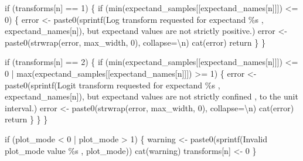 \documentclass[
  letterpaper,
  DIV=11,
  numbers=noendperiod]{scrartcl}
\newenvironment{Shaded}{\begin{snugshade}}{\end{snugshade}}
\newcommand{\AttributeTok}[1]{\textcolor[rgb]{0.40,0.45,0.13}{#1}}
\newcommand{\ControlFlowTok}[1]{\textcolor[rgb]{0.00,0.23,0.31}{#1}}
\newcommand{\DecValTok}[1]{\textcolor[rgb]{0.68,0.00,0.00}{#1}}
\newcommand{\FunctionTok}[1]{\textcolor[rgb]{0.28,0.35,0.67}{#1}}
\newcommand{\NormalTok}[1]{\textcolor[rgb]{0.00,0.23,0.31}{#1}}
\newcommand{\OtherTok}[1]{\textcolor[rgb]{0.00,0.23,0.31}{#1}}
\newcommand{\SpecialCharTok}[1]{\textcolor[rgb]{0.37,0.37,0.37}{#1}}
\newcommand{\StringTok}[1]{\textcolor[rgb]{0.13,0.47,0.30}{#1}}
\begin{document}
\begin{Shaded}
\begin{Highlighting}[]
    \ControlFlowTok{if}\NormalTok{ (transforms[n] }\SpecialCharTok{==} \DecValTok{1}\NormalTok{) \{}
      \ControlFlowTok{if}\NormalTok{ (}\FunctionTok{min}\NormalTok{(expectand\_samples[[expectand\_names[n]]]) }\SpecialCharTok{\textless{}=} \DecValTok{0}\NormalTok{) \{}
\NormalTok{        error }\OtherTok{\textless{}{-}} 
          \FunctionTok{paste0}\NormalTok{(}\FunctionTok{sprintf}\NormalTok{(}\StringTok{\textquotesingle{}Log transform requested for expectand \%s \textquotesingle{}}\NormalTok{, }
\NormalTok{                          expectand\_names[n]),}
                 \StringTok{\textquotesingle{}but expectand values are not strictly positive.\textquotesingle{}}\NormalTok{)}
\NormalTok{        error }\OtherTok{\textless{}{-}} \FunctionTok{paste0}\NormalTok{(}\FunctionTok{strwrap}\NormalTok{(error, max\_width, }\DecValTok{0}\NormalTok{), }\AttributeTok{collapse=}\StringTok{\textquotesingle{}}\SpecialCharTok{\textbackslash{}n}\StringTok{\textquotesingle{}}\NormalTok{)}
        \FunctionTok{cat}\NormalTok{(error)}
\NormalTok{        return}
\NormalTok{      \}}
\NormalTok{    \}}
    
    \ControlFlowTok{if}\NormalTok{ (transforms[n] }\SpecialCharTok{==} \DecValTok{2}\NormalTok{) \{}
      \ControlFlowTok{if}\NormalTok{ (}\FunctionTok{min}\NormalTok{(expectand\_samples[[expectand\_names[n]]]) }\SpecialCharTok{\textless{}=} \DecValTok{0} \SpecialCharTok{|}
          \FunctionTok{max}\NormalTok{(expectand\_samples[[expectand\_names[n]]]) }\SpecialCharTok{\textgreater{}=} \DecValTok{1}\NormalTok{) \{}
\NormalTok{        error }\OtherTok{\textless{}{-}} 
          \FunctionTok{paste0}\NormalTok{(}\FunctionTok{sprintf}\NormalTok{(}\StringTok{\textquotesingle{}Logit transform requested for expectand \%s \textquotesingle{}}\NormalTok{, }
\NormalTok{                          expectand\_names[n]),}
                 \StringTok{\textquotesingle{}but expectand values are not strictly confined \textquotesingle{}}\NormalTok{,}
                 \StringTok{\textquotesingle{}to the unit interval.\textquotesingle{}}\NormalTok{)}
\NormalTok{        error }\OtherTok{\textless{}{-}} \FunctionTok{paste0}\NormalTok{(}\FunctionTok{strwrap}\NormalTok{(error, max\_width, }\DecValTok{0}\NormalTok{), }\AttributeTok{collapse=}\StringTok{\textquotesingle{}}\SpecialCharTok{\textbackslash{}n}\StringTok{\textquotesingle{}}\NormalTok{)}
        \FunctionTok{cat}\NormalTok{(error)}
\NormalTok{        return}
\NormalTok{      \}}
\NormalTok{    \}}
\NormalTok{  \}}
  
  \ControlFlowTok{if}\NormalTok{ (plot\_mode }\SpecialCharTok{\textless{}} \DecValTok{0} \SpecialCharTok{|}\NormalTok{ plot\_mode }\SpecialCharTok{\textgreater{}} \DecValTok{1}\NormalTok{) \{}
\NormalTok{    warning }\OtherTok{\textless{}{-}} 
      \FunctionTok{paste0}\NormalTok{(}\FunctionTok{sprintf}\NormalTok{(}\StringTok{\textquotesingle{}Invalid \textasciigrave{}plot\_mode\textasciigrave{} value \%s \textquotesingle{}}\NormalTok{, plot\_mode))}
    \FunctionTok{cat}\NormalTok{(warning)}
\NormalTok{    transforms[n] }\OtherTok{\textless{}{-}} \DecValTok{0}
\NormalTok{  \}}


\end{Highlighting}
\end{Shaded}
\end{document}
